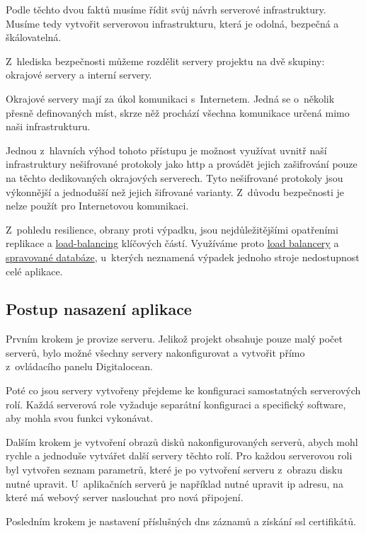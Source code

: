 \emptyLine

Podle těchto dvou faktů musíme řídit svůj návrh serverové infrastruktury.  Musíme tedy vytvořit serverovou infrastrukturu, která je odolná, bezpečná a škálovatelná.

Z~hlediska bezpečnosti můžeme rozdělit servery projektu \bso{} na dvě skupiny: okrajové servery a interní servery.

Okrajové servery mají za úkol komunikaci s~Internetem.
Jedná se o~několik přesně definovaných míst, skrze něž prochází všechna komunikace určená mimo naši infrastrukturu.

Jednou z~hlavních výhod tohoto přístupu je možnost využívat uvnitř naší infrastruktury nešifrované protokoly jako \acrshort{http}
a provádět jejich zašifrování pouze na těchto dedikovaných okrajových serverech.
Tyto nešifrované protokoly jsou výkonnější a jednodušší než jejich šifrované varianty\cite{http-faster-https}.
Z~důvodu bezpečnosti je nelze použít pro Internetovou komunikaci.

Z~pohledu resilience, obrany proti výpadku, jsou nejdůležitějšími opatřeními replikace a \hyperref[sub:load-balancing]{load-balancing} klíčových částí. Využíváme proto \hyperref[sub:load-balancing]{load balancery} a \hyperref[subsub:managed-databases]{spravované databáze}, u~kterých neznamená výpadek jednoho stroje nedostupnost celé aplikace.


\subsection{Postup nasazení aplikace}
\label{sub:deployment}

Prvním krokem je provize serveru. Jelikož projekt \bso{} obsahuje pouze malý počet serverů, bylo možné všechny servery nakonfigurovat a vytvořit přímo z~ovládacího panelu Digitalocean.

Poté co jsou servery vytvořeny přejdeme ke konfiguraci samostatných serverových rolí. Každá serverová role vyžaduje separátní konfiguraci a specifický software, aby mohla svou funkci vykonávat.

Dalším krokem je vytvoření obrazů disků nakonfigurovaných serverů, abych mohl rychle a jednoduše vytvářet další servery těchto rolí. Pro každou serverovou roli byl vytvořen seznam parametrů, které je po vytvoření serveru z~obrazu disku nutné upravit. U~aplikačních serverů je například nutné upravit \acrshort{ip} adresu, na které má webový server naslouchat pro nová připojení. 

Posledním krokem je nastavení příslušných \acrshort{dns} záznamů a získání \acrshort{ssl} certifikátů.

